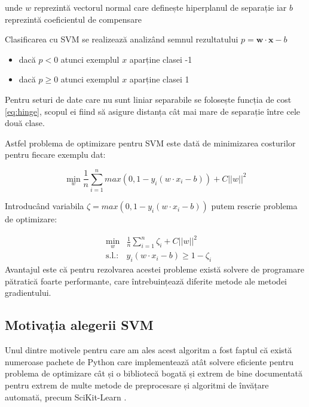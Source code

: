 unde $w$ reprezintă vectorul normal care definește hiperplanul de separație iar $b$ reprezintă coeficientul de compensare

Clasificarea cu SVM se realizează analizând semnul rezultatului $p = \mathbf{w} \cdot \mathbf{x} - b$

\begin{itemize}
    \item dacă $p < 0$ atunci exemplul $x$ aparține clasei -1
    \item dacă $p \geq 0$ atunci exemplul $x$ aparține clasei 1
\end{itemize}

Pentru seturi de date care nu sunt liniar separabile se folosește funcția de cost \eqref{eq:hinge}, scopul ei fiind să asigure distanța cât mai mare de separație între cele două clase.

Astfel problema de optimizare pentru SVM este dată de minimizarea costurilor pentru fiecare exemplu dat:

\begin{equation}
    \min_{w} \frac{1}{n} \sum_{i=1}^{n} max(0, 1 - y_{i}(w\cdot x_i - b)) + C||w||^2
    \label{eq:svm_opt}
\end{equation}

Introducând variabila $\zeta=max(0, 1 - y_{i}(w\cdot x_{i} - b))$ putem rescrie problema de optimizare:

\begin{subequations}
\begin{alignat}{2}
 &\!\min_{w} &  \frac{1}{n} \sum_{i=1}^{n} \zeta_{i} + C||w||^2 \label{eq:svm_opt} \\
&\text{s.l.:} &  y_{i}(w\cdot x_{i} -b) \geq 1- \zeta_i \label{eq:constr}
\end{alignat}
\label{eq:opt_problem}
\end{subequations}
Avantajul este că pentru rezolvarea acestei probleme există solvere de programare pătratică foarte performante, care întrebuințează diferite metode ale metodei gradientului.

\subsection{Motivația alegerii SVM}
Unul dintre motivele pentru care am ales acest algoritm a fost faptul că există numeroase pachete de Python care implementează atât solvere eficiente pentru problema de optimizare cât și o bibliotecă bogată și extrem de bine documentată pentru extrem de multe metode de preprocesare și algoritmi de învățare automată, precum SciKit-Learn \cite{scikit-learn} \cite{sklearn_api}.

